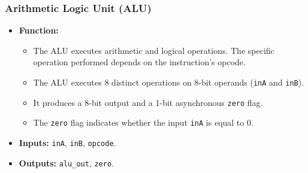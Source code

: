 \subsubsection*{Arithmetic Logic Unit (ALU)}
\begin{itemize}
	\item \textbf{Function:}
	      \begin{itemize}
		      \item The ALU executes arithmetic and logical operations. The specific operation performed depends on the instruction's opcode.
		      \item The ALU executes 8 distinct operations on 8-bit operands (\texttt{inA} and \texttt{inB}).
		      \item It produces a 8-bit output and a 1-bit asynchronous \texttt{zero} flag.
		      \item The \texttt{zero} flag indicates whether the input \texttt{inA} is equal to 0.
	      \end{itemize}
	\item \textbf{Inputs:} \texttt{inA}, \texttt{inB}, \texttt{opcode}.
	\item \textbf{Outputs:} \texttt{alu\_out}, \texttt{zero}.
\end{itemize}

